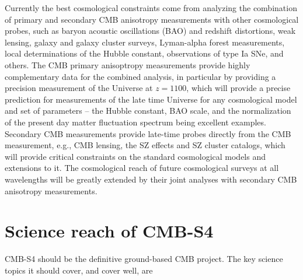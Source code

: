 Currently the best cosmological constraints come from analyzing the combination of primary and secondary CMB anisotropy measurements with other cosmological probes, such as baryon acoustic oscillations (BAO) and redshift distortions, weak lensing, galaxy and galaxy cluster surveys, Lyman-alpha forest measurements, local determinations of the Hubble constant, observations of type Ia SNe, and others. The CMB primary anisoptropy measurements provide highly complementary data for the combined analysis, in particular by providing a precision measurement of the Universe at $z = 1100$, which will provide a precise prediction for measurements of the late time Universe for any cosmological model and set of parameters -- the Hubble constant, BAO scale, and the normalization of the present day matter fluctuation spectrum being excellent examples. Secondary CMB measurements provide late-time probes directly from the CMB measurement, e.g., CMB lensing, the SZ effects and SZ cluster catalogs, which will provide critical constraints on the standard cosmological models and extensions to it. The cosmological reach of future cosmological surveys at all wavelengths will be greatly extended by their joint analyses with secondary CMB anisotropy measurements. 


\section{Science reach of CMB-S4}
\label{sec:science}

CMB-S4 should be the definitive ground-based CMB project. The key science topics it should cover, and cover well, are

